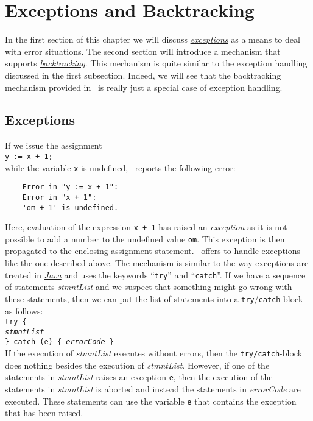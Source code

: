 \chapter{Exceptions and Backtracking}
In the first section of this chapter we will discuss
\href{https://en.wikipedia.org/wiki/Exception_handling}{\emph{exceptions}} as a means to deal with
error situations.  The second section will introduce a mechanism that supports
\href{https://en.wikipedia.org/wiki/Backtracking}{\emph{backtracking}}.  This mechanism is quite
similar to the exception handling discussed in the first subsection.  Indeed, we will see that the
backtracking mechanism provided in \setlx\ is really just a special case of exception handling.

\section{Exceptions}
If we issue the assignment
\\[0.2cm]
\hspace*{1.3cm}
\texttt{y := x + 1;}
\\[0.2cm]
while the variable \texttt{x} is undefined, \setlx\ reports the following error:
\begin{verbatim}
    Error in "y := x + 1":
    Error in "x + 1":
    'om + 1' is undefined.
\end{verbatim}
Here, evaluation of the expression \texttt{x + 1} has raised an \emph{exception} 
as it is not possible to add a number to the undefined value \texttt{om}.  This exception is then
propagated to the enclosing assignment statement. \setlx\ offers to handle exceptions like the
one described above.  The mechanism is similar to the way exceptions
are treated in 
\href{http://docs.oracle.com/javase/tutorial/essential/exceptions/}{\textsl{Java}} and uses the keywords
``\texttt{try}'' and ``\texttt{catch}''.   If we have a sequence of statements
\textsl{stmntList} and we suspect that 
something might go wrong with these statements, then we can put the list of statements into a
\texttt{try}/\texttt{catch}-block as follows:
\\[0.2cm]
\hspace*{1.3cm}
\texttt{try \{}
\\
\hspace*{1.8cm}
\texttt{\textsl{stmntList}}
\\
\hspace*{1.3cm}
\texttt{\} catch (e) \{ \textsl{errorCode} \}}
\\[0.2cm]
If the execution of \textsl{stmntList} executes without errors, then the
\texttt{try/catch}-block does nothing besides the execution of \textsl{stmntList}.  However, if
one of the statements in \textsl{stmntList} raises an exception \texttt{e}, then the execution of
the statements in \textsl{stmntList} is aborted and instead the statements in \textsl{errorCode} are
executed.  These statements can use the variable \texttt{e} that contains the exception that has
been raised.


